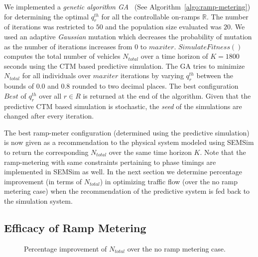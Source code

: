\documentclass{wscpaperproc}
\theoremstyle{wsc}
\begin{document}
We implemented a {\it genetic algorithm GA}~\cite{weise2009global} (See Algorithm~\ref{algo:ramp-metering}) for determining the optimal $q_r^{th}$ for all the controllable on-ramps $\mathbb{R}$. The number of iterations was restricted to $50$ and the population size evaluated was $20$. We used an adaptive {\it Gaussian} mutation which decreases the probability of mutation as the number of iterations increases from $0$ to $maxiter$. $SimulateFitness()$ computes the total number of vehicles $N_{total}$ over a time horizon of $K=1800$ seconds using the CTM based predictive simulation. The GA tries to minimize $N_{total}$ for all individuals over $maxiter$ iterations by varying $q_r^{th}$ between the bounds of $0.0$ and $0.8$ rounded to two decimal places. The best configuration $Best$ of $q_r^{th}$ over all $r \in R$ is returned at the end of the algorithm. Given that the predictive CTM based simulation is stochastic, the {\it seed} of the simulations are changed after every iteration.

The best ramp-meter configuration (determined using the predictive simulation) is now given as a recommendation to the physical system modeled using SEMSim to return the corresponding $N_{total}$ over the same time horizon $K$. Note that the ramp-metering with same constraints pertaining to phase timings are implemented in SEMSim as well. In the next section we determine percentage improvement (in terms of $N_{total}$) in optimizing traffic flow (over the no ramp metering case) when the recommendation of the predictive system is fed back to the simulation system.

\subsection{Efficacy of Ramp Metering}
\begin{figure}[!htbp]
      \centering
      \caption{Percentage improvement of $N_{total}$ over the no ramp metering case.}
      \label{fig:improvement-ramp-metering}
      \end{figure}
\end{document}
